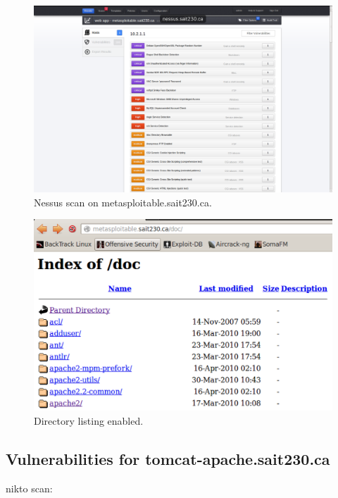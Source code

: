\documentclass{article}
\begin{document}
\begin{figure}[h!]
	\includegraphics[width=\linewidth]{images/nessus-metasploitable.png}
	\caption{Nessus scan on metasploitable.sait230.ca.}
	\label{fig:nessus-metasploitable}
\end{figure}

\begin{figure}[h!]
	\includegraphics[width=\linewidth]{images/screenshot.png}
	\caption{Directory listing enabled.}
	\label{fig:directory-listing}
\end{figure}

\newpage
\subsection{Vulnerabilities for tomcat-apache.sait230.ca}
nikto scan:
\end{document}
